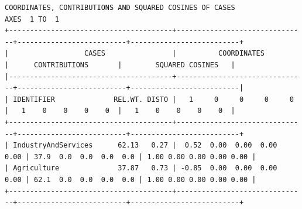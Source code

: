 \documentclass[a4paper,10pt,twocolumn]{article}
\begin{document}
\begin{landscape}
\begin{verbatim}
COORDINATES, CONTRIBUTIONS AND SQUARED COSINES OF CASES
AXES  1 TO  1
+---------------------------------------+-------------------------------+--------------------------+--------------------------+
|                  CASES                |          COORDINATES          |      CONTRIBUTIONS       |        SQUARED COSINES   |
|---------------------------------------+-------------------------------+--------------------------+--------------------------|
| IDENTIFIER              REL.WT. DISTO |   1     0     0     0     0   |   1    0    0    0    0  |   1    0    0    0    0  |
+---------------------------------------+-------------------------------+--------------------------+--------------------------+
| IndustryAndServices      62.13   0.27 |  0.52  0.00  0.00  0.00  0.00 | 37.9  0.0  0.0  0.0  0.0 | 1.00 0.00 0.00 0.00 0.00 |
| Agriculture              37.87   0.73 | -0.85  0.00  0.00  0.00  0.00 | 62.1  0.0  0.0  0.0  0.0 | 1.00 0.00 0.00 0.00 0.00 |
+---------------------------------------+-------------------------------+--------------------------+--------------------------+
\end{verbatim}

\newpage

\end{landscape}
\end{document}
